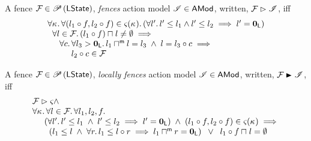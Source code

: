 %
%
\begin{definition} A fence $\mathcal{F}_{} \in \mathscr{P}\left(\textsf{LState} \right)$, \emph{fences} action model $\mathscr{I} \in \textsf{AMod}$, written, $\mathcal{F}_{} \mathrel{\rhd} \mathscr{I}$, iff 
%
\[ 
\begin{array}{l}
 		
	\forall \kappa_{}.\, \forall (l_1 \circ f, l_2 \circ f) \in \varsigma_{}(\kappa_{}).\, (\forall l'.\, l' \leq l_1 \land l' \leq l_2 \implies l' = \mathbf{0}_{\textsf{L}} ) \\
  \hspace*{0.2cm} \forall l \in \mathcal{F}_{}.\, (l_1 \circ f) \sqcap_{} l \not= \emptyset \implies \\
  \hspace*{0.5cm} \forall c.\, \forall l_3 > \mathbf{0}_{\textsf{L}}.\, l_1 \sqcap_{}^{\textsf{m}} l = l_3 \;\land\; l = l_3 \circ c\implies\\
  \hspace*{1cm} l_2 \circ c \in \mathcal{F}_{}	 
\end{array}
\]
%
\end{definition}
%
%
\begin{definition}
A fence $\mathcal{F}_{} \in \mathscr{P}\left(\textsf{LState} \right)$, \emph{locally fences} action model $\mathscr{I} \in \textsf{AMod}$, written, $\fence{} \strictfences \lmod$, iff 
%
\[ 
\begin{array}{l}
	\mathcal{F}_{} \mathrel{\rhd} \varsigma_{} \land \\
	\forall \kappa_{}.\, \forall l \in \mathcal{F}_{}.\, \forall l_1, l_2, f.\,\\
	\hspace*{0.5cm} (\forall l'.\, l' \leq l_1 \;\land\; l' \leq l_2 \implies l' = \mathbf{0}_{\textsf{L}}) \;\land\; (l_1 \circ f, l_2 \circ f) \in \varsigma_{}(\kappa_{})  \implies \\
	 \hspace*{0.7cm} \left(l_1 \leq l \;\land\; \forall r.\, l_1 \leq l \circ r \implies l_1 \sqcap_{}^{\textsf{m}} r = \mathbf{0}_{\textsf{L}}\right) \;\;\lor\;\; l_1 \circ f \sqcap_{} l = \emptyset
\end{array}
\]
%
\end{definition}
%
%
